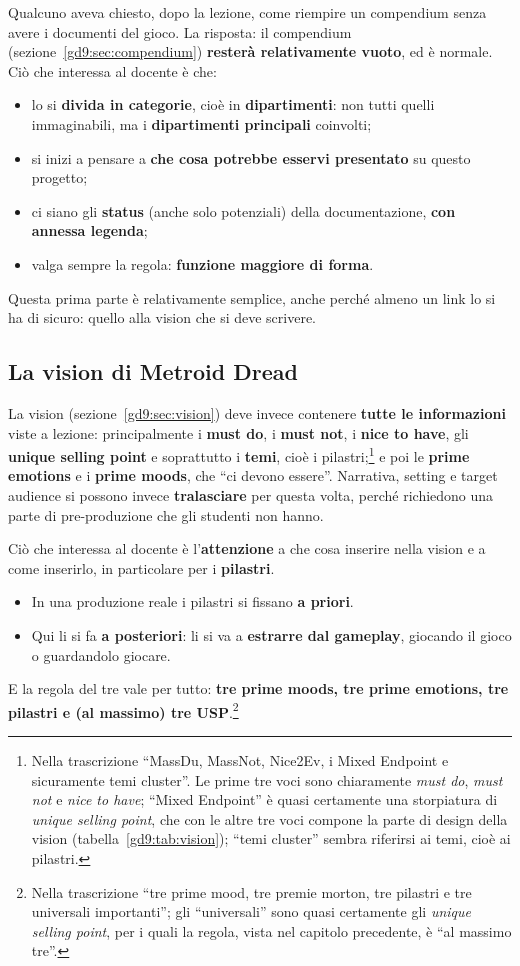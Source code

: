 Qualcuno aveva chiesto, dopo la lezione, come riempire un compendium senza
avere i documenti del gioco. La risposta: il compendium
(sezione~\ref{gd9:sec:compendium}) \textbf{resterà relativamente vuoto}, ed
è normale. Ciò che interessa al docente è che:
\begin{itemize}
  \item lo si \textbf{divida in categorie}, cioè in \textbf{dipartimenti}:
        non tutti quelli immaginabili, ma i \textbf{dipartimenti
        principali} coinvolti;
  \item si inizi a pensare a \textbf{che cosa potrebbe esservi presentato}
        su questo progetto;
  \item ci siano gli \textbf{status} (anche solo potenziali) della
        documentazione, \textbf{con annessa legenda};
  \item valga sempre la regola: \textbf{funzione maggiore di forma}.
\end{itemize}
Questa prima parte è relativamente semplice, anche perché almeno un link lo
si ha di sicuro: quello alla vision che si deve scrivere.

\subsection{La vision di Metroid Dread}

La vision (sezione~\ref{gd9:sec:vision}) deve invece contenere \textbf{tutte
le informazioni} viste a lezione: principalmente i \textbf{must do}, i
\textbf{must not}, i \textbf{nice to have}, gli \textbf{unique selling point}
e soprattutto i \textbf{temi}, cioè i pilastri;\footnote{Nella trascrizione
``MassDu, MassNot, Nice2Ev, i Mixed Endpoint e sicuramente temi cluster''.
Le prime tre voci sono chiaramente \emph{must do}, \emph{must not} e
\emph{nice to have}; ``Mixed Endpoint'' è quasi certamente una storpiatura di
\emph{unique selling point}, che con le altre tre voci compone la parte di
design della vision (tabella~\ref{gd9:tab:vision}); ``temi cluster'' sembra
riferirsi ai temi, cioè ai pilastri.} e poi le \textbf{prime emotions} e i
\textbf{prime moods}, che ``ci devono essere''. Narrativa, setting e target
audience si possono invece \textbf{tralasciare} per questa volta, perché
richiedono una parte di pre-produzione che gli studenti non hanno.

Ciò che interessa al docente è l'\textbf{attenzione} a che cosa inserire
nella vision e a come inserirlo, in particolare per i \textbf{pilastri}.
\begin{itemize}
  \item In una produzione reale i pilastri si fissano \textbf{a priori}.
  \item Qui li si fa \textbf{a posteriori}: li si va a \textbf{estrarre dal
        gameplay}, giocando il gioco o guardandolo giocare.
\end{itemize}
E la regola del tre vale per tutto: \textbf{tre prime moods, tre prime
emotions, tre pilastri e (al massimo) tre USP}.\footnote{Nella trascrizione
``tre prime mood, tre premie morton, tre pilastri e tre universali
importanti''; gli ``universali'' sono quasi certamente gli \emph{unique
selling point}, per i quali la regola, vista nel capitolo precedente, è
``al massimo tre''.}

